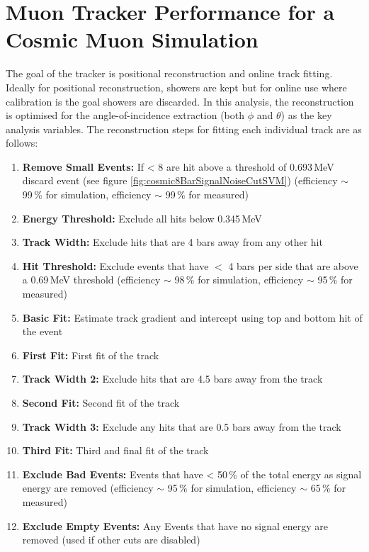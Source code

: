 \section{Muon Tracker Performance for a Cosmic Muon Simulation}\label{sec:SimulationOfCosmics}
The goal of the tracker is positional reconstruction and online track fitting. Ideally for positional reconstruction, showers are kept but for online use where calibration is the goal showers are discarded. In this analysis, the reconstruction is optimised for the angle-of-incidence extraction (both $\phi$ and $\theta$) as the key analysis variables. The reconstruction steps for fitting each individual track are as follows: 
\begin{enumerate}
  \item \textbf{Remove Small Events:} If < 8 are hit above a threshold of 0.693\,MeV discard event (see figure \ref{fig:cosmic8BarSignalNoiseCutSVM}) (efficiency $\sim$ 99\,\% for simulation, efficiency $\sim$ 99\,\% for measured)
  \item \textbf{Energy Threshold:} Exclude all hits below 0.345\,MeV
  \item \textbf{Track Width:} Exclude hits that are 4 bars away from any other hit 
  \item \textbf{Hit Threshold:} Exclude events that have $<$ 4 bars per side that are above a 0.69\,MeV threshold (efficiency $\sim$ 98\,\% for simulation, efficiency $\sim$ 95\,\% for measured)
  \item \textbf{Basic Fit:} Estimate track gradient and intercept using top and bottom hit of the event
  \item \textbf{First Fit:} First fit of the track 
  \item \textbf{Track Width 2:} Exclude hits that are 4.5 bars away from the track
  \item \textbf{Second Fit:} Second fit of the track
  \item \textbf{Track Width 3:} Exclude any hits that are 0.5 bars away from the track
  \item \textbf{Third Fit:} Third and final fit of the track
  \item \textbf{Exclude Bad Events:} Events that have < 50\,\% of the total energy as signal energy are removed (efficiency $\sim$ 95\,\% for simulation, efficiency $\sim$ 65\,\% for measured)
  \item \textbf{Exclude Empty Events:} Any Events that have no signal energy are removed (used if other cuts are disabled) 
\end{enumerate}

